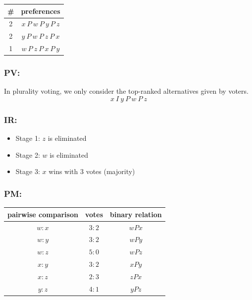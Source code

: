 \documentclass[a4paper]{article}
\begin{document}
\begin{table}[!htbp]
    \centering
    \begin{tabular}{c|c|}
        \# & preferences         \\ 
        \hline
        2  & $x\: P\: w\: P\: y\: P\: z$ \\
        2  & $y\: P\: w\: P\: z\: P\: x$ \\
        1  & $w\: P\: z\: P\: x\: P\: y$ \\
        \hline
    \end{tabular}
\end{table}

\subsubsection*{PV:}

In plurality voting, we only consider the top-ranked alternatives given by voters.
\[x\: I\: y\: P\: w\: P\: z  \]

\subsubsection*{IR:}

\begin{itemize}
    \item Stage 1: $z$ is eliminated
    \item Stage 2: $w$ is eliminated
    \item Stage 3: $x$ wins with 3 votes (majority)
\end{itemize}

\subsubsection*{PM:}


\begin{table}[!htbp]
    \centering
    \begin{tabular}{ccc}
        pairwise comparison & votes  & binary relation \\
        \hline 
        $w:x$  & $3:2$  & $wPx$           \\
        $w:y$  & $3:2$  & $wPy$           \\
        $w:z$  & $5:0$  & $wPz$           \\
        $x:y$  & $3:2$  & $xPy$           \\
        $x:z$  & $2:3$  & $zPx$           \\
        $y:z$  & $4:1$  & $yPz$           \\
        \hline
    \end{tabular}
\end{table}
\end{document}
